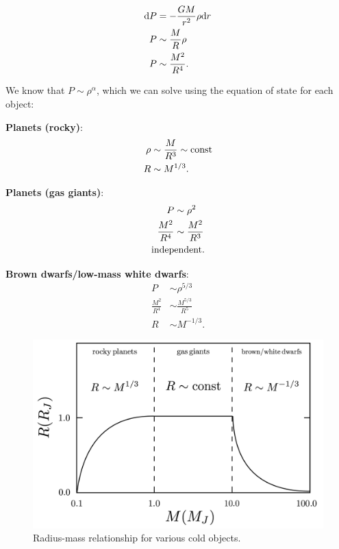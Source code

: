 \documentclass[a4paper,10pt]{article}
\begin{document}
\begin{align*}
    {\rm d}P &= -\frac{GM}{r^2}\rho{\rm d}r \\
           P &\sim \frac{M}{R}\rho \\
           P &\sim \frac{M^2}{R^4}.
\end{align*}

{\noindent}We know that $P\sim\rho^\alpha$, which we can solve using the equation of state for each object:

{\noindent}\textbf{Planets (rocky)}:
\begin{align*}
    \rho &\sim \frac{M}{R^3} \sim {\rm const} \\
    R &\sim M^{1/3}.
\end{align*}

{\noindent}\textbf{Planets (gas giants)}:
\begin{align*}
    P &\sim \rho^2 \\
    \frac{M^2}{R^4} &\sim \frac{M^2}{R^3} \\
    {\rm indep}&{\rm endent}.
\end{align*}

{\noindent}\textbf{Brown dwarfs/low-mass white dwarfs}:
\begin{align*}
    P &\sim \rho^{5/3} \\
    \frac{M^2}{R^4} &\sim \frac{M^{5/3}}{R^5} \\
    R &\sim M^{-1/3}.
\end{align*}

\begin{figure}[h]
    \centering
    \includegraphics[width=12cm]{figures/RadiusMass.png}
    \caption{\footnotesize{Radius-mass relationship for various cold objects.}}
    \label{fig:radiusmass}
\end{figure}
\end{document}
